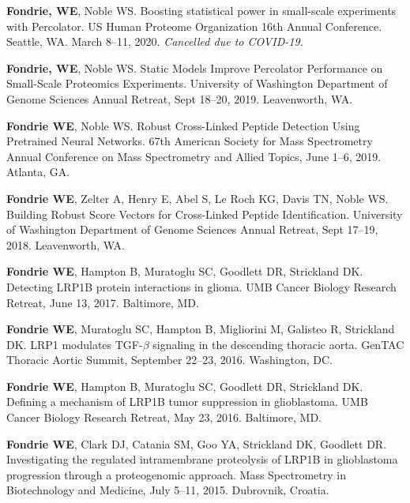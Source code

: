 \documentclass{article}
\newcommand{\mysection}[1]{\vspace{1ex {\bf \large \textrm{#1}} \quad \hrulefill}}
\begin{document}
\mysection{Poster Presentations}

\begin{etaremune}
  \item {\bf Fondrie, WE}, Noble WS. Boosting statistical power in small-scale
    experiments with Percolator. US Human Proteome Organization 16th Annual
    Conference. Seattle, WA. March 8--11, 2020. \textit{Cancelled due to
      COVID-19.}
  
  \item {\bf Fondrie, WE}, Noble WS. Static Models Improve Percolator
    Performance on Small-Scale Proteomics Experiments. University of Washington
    Department of Genome Sciences Annual Retreat, Sept 18--20, 2019.
    Leavenworth, WA.
  
  \item {\bf Fondrie WE}, Noble WS. Robust Cross-Linked Peptide Detection Using
    Pretrained Neural Networks. 67th American Society for Mass Spectrometry
    Annual Conference on Mass Spectrometry and Allied Topics, June 1--6, 2019.
    Atlanta, GA.

  \item {\bf Fondrie WE}, Zelter A, Henry E, Abel S, Le Roch KG, Davis TN, Noble
    WS. Building Robust Score Vectors for Cross-Linked Peptide Identification.
    University of Washington Department of Genome Sciences Annual Retreat, Sept
    17--19, 2018. Leavenworth, WA.

  \item {\bf Fondrie WE}, Hampton B, Muratoglu SC, Goodlett DR, Strickland DK.
    Detecting LRP1B protein interactions in glioma. UMB Cancer Biology Research
    Retreat, June 13, 2017. Baltimore, MD.

  \item {\bf Fondrie WE}, Muratoglu SC, Hampton B, Migliorini M, Galisteo R,
    Strickland DK. LRP1 modulates TGF-$\beta$ signaling in the descending
    thoracic aorta. GenTAC Thoracic Aortic Summit, September 22--23, 2016.
    Washington, DC.

  \item {\bf Fondrie WE}, Hampton B, Muratoglu SC, Goodlett DR, Strickland DK.
    Defining a mechanism of LRP1B tumor suppression in glioblastoma. UMB Cancer
    Biology Research Retreat, May 23, 2016. Baltimore, MD.

  \item {\bf Fondrie WE}, Clark DJ, Catania SM, Goo YA, Strickland DK, Goodlett
    DR. Investigating the regulated intramembrane proteolysis of LRP1B in
    glioblastoma progression through a proteogenomic approach. Mass Spectrometry
    in Biotechnology and Medicine, July 5--11, 2015. Dubrovnik, Croatia.


\end{etaremune}
\end{document}
